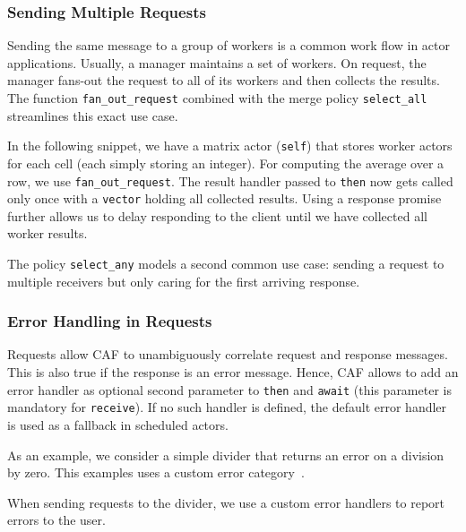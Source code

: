 \subsubsection{Sending Multiple Requests}

Sending the same message to a group of workers is a common work flow in actor
applications. Usually, a manager maintains a set of workers. On request, the
manager fans-out the request to all of its workers and then collects the
results. The function \lstinline`fan_out_request` combined with the merge policy
\lstinline`select_all` streamlines this exact use case.

In the following snippet, we have a matrix actor (\lstinline`self`) that stores
worker actors for each cell (each simply storing an integer). For computing the
average over a row, we use \lstinline`fan_out_request`. The result handler
passed to \lstinline`then` now gets called only once with a \lstinline`vector`
holding all collected results. Using a response promise  further
allows us to delay responding to the client until we have collected all worker
results.


The policy \lstinline`select_any` models a second common use case: sending a
request to multiple receivers but only caring for the first arriving response.

\clearpage
\subsubsection{Error Handling in Requests}
\label{error-response}

Requests allow CAF to unambiguously correlate request and response messages.
This is also true if the response is an error message. Hence, CAF allows to
add an error handler as optional second parameter to \lstinline^then^ and
\lstinline^await^ (this parameter is mandatory for \lstinline^receive^). If no
such handler is defined, the default error handler  is used
as a fallback in scheduled actors.

As an example, we consider a simple divider that returns an error on a division
by zero. This examples uses a custom error category~.


When sending requests to the divider, we use a custom error handlers to report
errors to the user.

